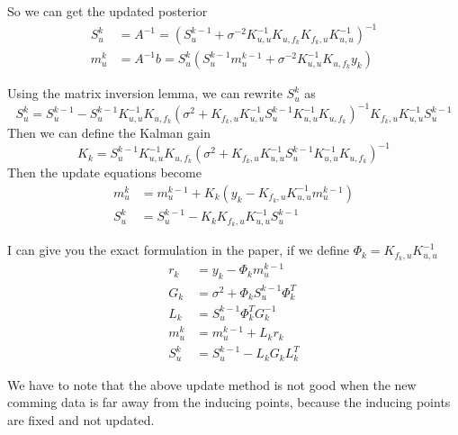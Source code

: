 \documentclass[10pt]{elegantbook}
\begin{document}
So we can get the updated posterior
\begin{equation}    
    \begin{aligned}
        S_u^k &= A^{-1} =  (S_u^{k-1} + \sigma^{-2} K_{u, u}^{-1} K_{u, f_k} K_{f_k, u} K_{u, u}^{-1})^{-1} \\
        m_u^k &= A^{-1}b = S_u^k (S_u^{k-1} m_u^{k-1} + \sigma^{-2} K_{u, u}^{-1} K_{u, f_k} y_k)
    \end{aligned}   
\end{equation}

Using the matrix inversion lemma, we can rewrite $S_u^k$ as
\begin{equation}
    S_u^k = S_u^{k-1} - S_u^{k-1} K_{u, u}^{-1} K_{u, f_k} (\sigma^2 + K_{f_k, u} K_{u, u}^{-1} S_u^{k-1} K_{u, u}^{-1} K_{u, f_k})^{-1} K_{f_k, u} K_{u, u}^{-1} S_u^{k-1}
\end{equation}
Then we can define the Kalman gain
\begin{equation}
    K_k = S_u^{k-1} K_{u, u}^{-1} K_{u, f_k} (\sigma^2 + K_{f_k, u} K_{u, u}^{-1} S_u^{k-1} K_{u, u}^{-1} K_{u, f_k})^{-1}
\end{equation}
Then the update equations become
\begin{equation}
    \begin{aligned}
        m_u^k &= m_u^{k-1} + K_k (y_k - K_{f_k, u} K_{u, u}^{-1} m_u^{k-1}) \\
        S_u^k &= S_u^{k-1} - K_k K_{f_k, u} K_{u, u}^{-1} S_u^{k-1}
    \end{aligned}
\end{equation}

I can give you the exact formulation in the paper, if we define $\Phi_k = K_{f_k, u} K_{u, u}^{-1}$
\begin{equation}
    \begin{aligned}
        r_k &= y_k - \Phi_k m_u^{k-1} \\
        G_k &= \sigma^2 + \Phi_k S_u^{k-1} \Phi_k^T \\
        L_k &= S_u^{k-1} \Phi_k^T G_k^{-1} \\
        m_u^k &= m_u^{k-1} + L_k r_k \\
        S_u^k &= S_u^{k-1} - L_k G_k L_k^T
    \end{aligned}
\end{equation}

\begin{remark}
    We have to note that the above update method is not good when the new comming data is far away from the inducing points, because the inducing points are fixed and not updated.
\end{remark}
\end{document}
